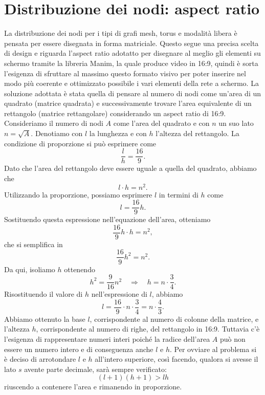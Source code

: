 \documentclass[binding=0.6cm]{sapthesis}
\begin{document}
\section{Distribuzione dei nodi: aspect ratio}
\label{sec:aspect_ratio}
La distribuzione dei nodi per i tipi di grafi mesh, torus e modalità libera è pensata per essere disegnata in forma matriciale. Questo segue una precisa scelta di design e riguarda
l'aspect ratio adotatto per disegnare al meglio gli elementi su schermo tramite la libreria Manim, la quale produce video in 16:9, quindi è sorta l'esigenza
di sfruttare al massimo questo formato visivo per poter inserire nel modo più coerente e ottimizzato possibile i vari elementi della rete a schermo.
La soluzione adottata è stata quella di pensare al numero di nodi come un'area di un quadrato (matrice quadrata) e successivamente trovare l'area equivalente 
di un rettangolo (matrice rettangolare) considerando un
aspect ratio di 16:9. Consideriamo il numero di nodi \(A\) come l'area del quadrato e con \(n\) un suo lato \(n = \sqrt{A}\).
Denotiamo con $l$ la lunghezza e con $h$ l'altezza del rettangolo. La condizione di proporzione si può esprimere come
\[
\frac{l}{h} = \frac{16}{9}.
\]
Dato che l'area del rettangolo deve essere uguale a quella del quadrato, abbiamo che
\[
l \cdot h = n^2.
\]
Utilizzando la proporzione, possiamo esprimere $l$ in termini di $h$ come
\[
l = \frac{16}{9}h.
\]
Sostituendo questa espressione nell'equazione dell'area, otteniamo
\[
\frac{16}{9}h \cdot h = n^2,
\]
che si semplifica in
\[
\frac{16}{9}h^2 = n^2.
\]
Da qui, isoliamo $h$ ottenendo
\[
h^2 = \frac{9}{16}n^2 \quad \Longrightarrow \quad h = n \cdot \frac{3}{4}.
\]
Risostituendo il valore di $h$ nell'espressione di $l$, abbiamo
\[
l = \frac{16}{9} \cdot n \cdot \frac{3}{4} = n \cdot \frac{4}{3}.
\]
Abbiamo ottenuto la base \(l\), corrispondente al numero di colonne della matrice, e l'altezza \(h\), corrispondente al numero
di righe, del rettangolo in 16:9. Tuttavia c'è l'esigenza di rappresentare numeri interi poiché la radice dell'area \(A\) può non essere un numero intero e di conseguenza anche \(l\) e \(h\).
Per ovviare al problema si è deciso di arrotondare \(l\) e \(h\) all'intero superiore, così facendo, qualora si avesse
il lato \(s\) avente parte decimale, sarà sempre verificato:
\begin{equation}
    (l+1)(h+1)>lh
\end{equation}
riuscendo a contenere l'area e rimanendo in proporzione.
\end{document}
